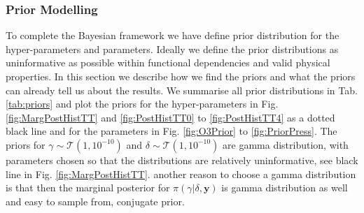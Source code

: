 \subsubsection{Prior Modelling}
To complete the Bayesian framework we have define prior distribution for the hyper-parameters and parameters.
Ideally we define the prior distributions as uninformative as possible within functional dependencies and valid physical properties.
In this section we describe how we find the priors and what the priors can already tell us about the results.
We summarise all prior distributions in Tab. \ref{tab:priors} and plot the priors for the hyper-parameters in Fig. \ref{fig:MargPostHistTT} and \ref{fig:PostHistTT0}  to \ref{fig:PostHistTT4} as a dotted black line and for the parameters in Fig. \ref{fig:O3Prior} to \ref{fig:PriorPress}.
The priors for $\gamma \sim \mathcal{T}(1,10^{-10}) $ and $\delta \sim \mathcal{T}(1,10^{-10})$ are gamma distribution, with parameters chosen so that the distributions are relatively uninformative, see black line in Fig. \ref{fig:MargPostHistTT}.
another reason to choose a gamma distribution is that then the marginal posterior for $\pi(\gamma|\delta,\bm{y})$ is gamma distribution as well and easy to sample from, conjugate prior.

